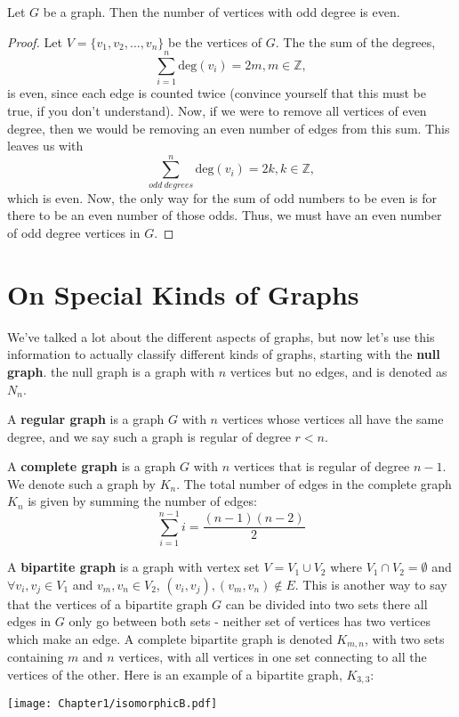\begin{lemma}
    Let $G$ be a graph. Then the number of vertices with odd degree is even.
\end{lemma}
\begin{proof}
    Let $V = \{v_1, v_2, \ldots, v_n\}$ be the vertices of $G$. The the sum of the degrees,
    \begin{equation*}
        \sum_{i=1}^n \text{deg}(v_i) = 2m, m \in \mathbb{Z},
    \end{equation*}
    is even, since each edge is counted twice (convince yourself that this must be true, if you don't understand). Now, if we were to remove all vertices of even degree, then we would be removing an even number of edges from this sum. This leaves us with
    \begin{equation*}
        \sum_{odd~degrees}^n \text{deg}(v_i) = 2k, k \in \mathbb{Z},
    \end{equation*}
    which is even. Now, the only way for the sum of odd numbers to be even is for there to be an even number of those odds. Thus, we must have an even number of odd degree vertices in $G$.
\end{proof}
\section{On Special Kinds of Graphs}
We've talked a lot about the different aspects of graphs, but now let's use this information to actually classify different kinds of graphs, starting with the \textbf{null graph}. the null graph is a graph with $n$ vertices but no edges, and is denoted as $N_n$.

A \textbf{regular graph} is a graph $G$ with $n$ vertices whose vertices all have the same degree, and we say such a graph is regular of degree $r < n$.

A \textbf{complete graph} is a graph $G$ with $n$ vertices that is regular of degree $n-1$. We denote such a graph by $K_n$. The total number of edges in the complete graph $K_n$ is given by summing the number of edges: 
\begin{equation*}
    \sum_{i=1}^{n-1} i = \frac{(n-1)(n-2)}{2}
\end{equation*}

A \textbf{bipartite graph} is a graph with vertex set $V = V_1 \cup V_2$ where $V_1 \cap V_2 = \emptyset$ and $\forall v_i, v_j \in V_1$ and $v_m, v_n \in V_2$, $(v_i, v_j), (v_m, v_n) \not\in E$. This is another way to say that the vertices of a bipartite graph $G$ can be divided into two sets there all edges in $G$ only go between both sets - neither set of vertices has two vertices which make an edge. A complete bipartite graph is denoted $K_{m, n}$, with two sets containing $m$ and $n$ vertices, with all vertices in one set connecting to all the vertices of the other. Here is an example of a bipartite graph, $K_{3, 3}$:
\begin{center}
    \texttt{[image: Chapter1/isomorphicB.pdf]}
\end{center}

